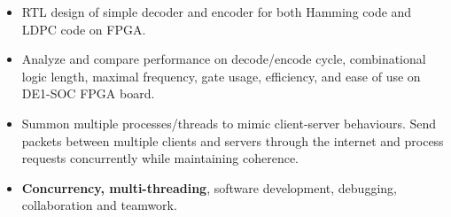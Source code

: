 \documentclass[10pt,a4paper,ragged2e,withhyper]{altacv}
\begin{document}
\begin{paracol}{2}
\begin{itemize}
    \item RTL design of simple decoder and encoder for both Hamming code and LDPC code on FPGA.
    \item Analyze and compare performance on decode/encode cycle, combinational logic length, maximal frequency, gate usage, efficiency, and ease of use on DE1-SOC FPGA board.
\end{itemize}

\divider

\begin{itemize}
    \item Summon multiple processes/threads to mimic client-server behaviours. Send packets between multiple clients and servers through the internet and process requests concurrently while maintaining coherence.
    \item \textbf{Concurrency, multi-threading}, software development, debugging, collaboration and teamwork.
\end{itemize}

\medskip







\end{paracol}
\end{document}
